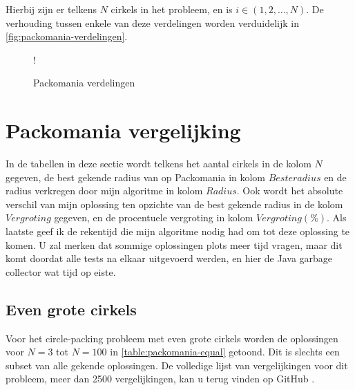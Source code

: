 \documentclass[12pt,a4paper,oneside]{book}
\begin{document}
Hierbij zijn er telkens $N$ cirkels in het probleem, en is $i \in (1,2,...,N)$.
De verhouding tussen enkele van deze verdelingen worden verduidelijk in \autoref{fig:packomania-verdelingen}.

\begin {figure}
	\centering
	 {!} {
	}
	\caption{Packomania verdelingen}
	\label{fig:packomania-verdelingen}
\end {figure}

\section{Packomania vergelijking}

In de tabellen in deze sectie wordt telkens het aantal cirkels in de kolom $N$ gegeven, de best gekende radius van op Packomania in kolom $Beste radius$ en de radius verkregen door mijn algoritme in kolom $Radius$.
Ook wordt het absolute verschil van mijn oplossing ten opzichte van de best gekende radius in de kolom $Vergroting$ gegeven, en de procentuele vergroting in kolom $Vergroting (\%)$.
Als laatste geef ik de rekentijd die mijn algoritme nodig had om tot deze oplossing te komen.
U zal merken dat sommige oplossingen plots meer tijd vragen, maar dit komt doordat alle tests na elkaar uitgevoerd werden, en hier de Java garbage collector wat tijd op eiste.

\subsection{Even grote cirkels}

Voor het circle-packing probleem met even grote cirkels worden de oplossingen voor $N=3$ tot $N=100$ in \autoref{table:packomania-equal} getoond.
Dit is slechts een subset van alle gekende oplossingen.
De volledige lijst van vergelijkingen voor dit probleem, meer dan 2500 vergelijkingen, kan u terug vinden op GitHub \cite{packomania-tables-github}.
\end{document}
